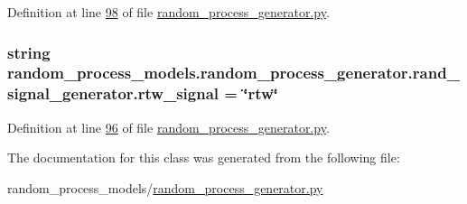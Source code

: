Definition at line \hyperlink{random__process__generator_8py_source_l00098}{98} of file \hyperlink{random__process__generator_8py_source}{random\+\_\+process\+\_\+generator.\+py}.

\hypertarget{classrandom__process__models_1_1random__process__generator_1_1rand__signal__generator_a6628ea9c95a141778e1bb0e8ba8d0845}{}
\subsubsection[{rtw\+\_\+signal}]{\setlength{\rightskip}{0pt plus 5cm}string random\+\_\+process\+\_\+models.\+random\+\_\+process\+\_\+generator.\+rand\+\_\+signal\+\_\+generator.\+rtw\+\_\+signal = \char`\"{}rtw\char`\"{}\hspace{0.3cm}{\ttfamily [static]}}\label{classrandom__process__models_1_1random__process__generator_1_1rand__signal__generator_a6628ea9c95a141778e1bb0e8ba8d0845}


Definition at line \hyperlink{random__process__generator_8py_source_l00096}{96} of file \hyperlink{random__process__generator_8py_source}{random\+\_\+process\+\_\+generator.\+py}.



The documentation for this class was generated from the following file\+:\begin{DoxyCompactItemize}
\item 
random\+\_\+process\+\_\+models/\hyperlink{random__process__generator_8py}{random\+\_\+process\+\_\+generator.\+py}\end{DoxyCompactItemize}
